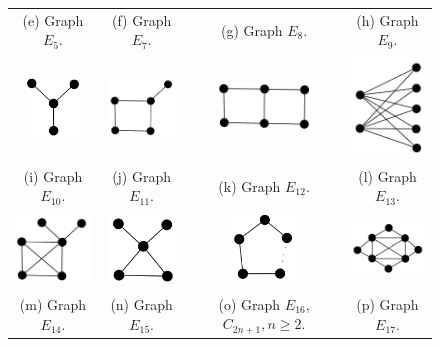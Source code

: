 \documentclass{dmgt}
\begin{document}
\begin{figure}[htb]
\begin{tabular}{  c c c c }
    \footnotesize (e) Graph $E_5$.
    & \footnotesize (f)   Graph $E_7$. 
    & 
    \footnotesize (g) Graph $E_8$.
    & 
    \footnotesize (h) Graph $E_9$.
    \\%
    \includegraphics[width=1.5cm]{e10.png} 
    & 
    \includegraphics[width=1.8cm]{e11.png} 
    &
    \includegraphics[width=2.5cm]{e12.png} 
    & 
    \includegraphics[width=2cm]{k25.png} 
    \\ %
    \footnotesize (i) Graph $E_{10}$.
    & 
    \footnotesize (j) Graph $E_{11}$.
    &
    \footnotesize (k)  Graph $E_{12}$. 
    & 
    \footnotesize (l) Graph $E_{13}$.
    \\
   \includegraphics[width=2cm]{e14.png} 
    & 
    \includegraphics[width=1.8cm]{e15.png} 
    & 
    \includegraphics[width=1.8cm]{c2n+1.png} 
    &
    \includegraphics[width=2.5cm]{4sunNoLabel.png}
    \\
    \footnotesize (m) Graph  $E_{14}$.
    & 
    \footnotesize (n) Graph $E_{15}$.
    & 
    \footnotesize (o)  Graph $E_{16}$,  $C_{2n+1},n\geq2$.
    &
    \footnotesize (p)  Graph $E_{17}$.
  

\end{tabular}
\end{figure}
\end{document}
